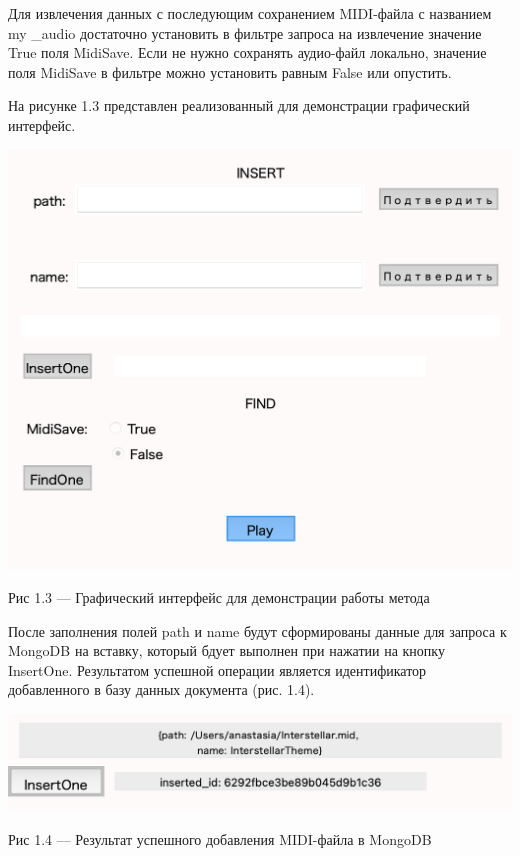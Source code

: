 Для извлечения данных с последующим сохранением MIDI-файла с названием my \_audio достаточно установить в фильтре запроса на извлечение значение True поля MidiSave. Если не нужно сохранять аудио-файл локально, значение поля MidiSave в фильтре можно установить равным False или опустить.

На рисунке 1.3 представлен реализованный для демонстрации графический интерфейс.

\begin{center}
		\includegraphics[scale=0.6]{tex/img/Tkinter.png}
		
			Рис 1.3 — Графический интерфейс для демонстрации работы метода
\end{center} 

После заполнения полей path и name будут сформированы данные для запроса к MongoDB на вставку, который бдует выполнен при нажатии на кнопку InsertOne. Результатом успешной операции является идентификатор добавленного в базу данных документа (рис. 1.4). 

\begin{center}
		\includegraphics[scale=0.6]{tex/img/Tkinter1.png}
		
			Рис 1.4 — Результат успешного добавления MIDI-файла в MongoDB
\end{center} 

